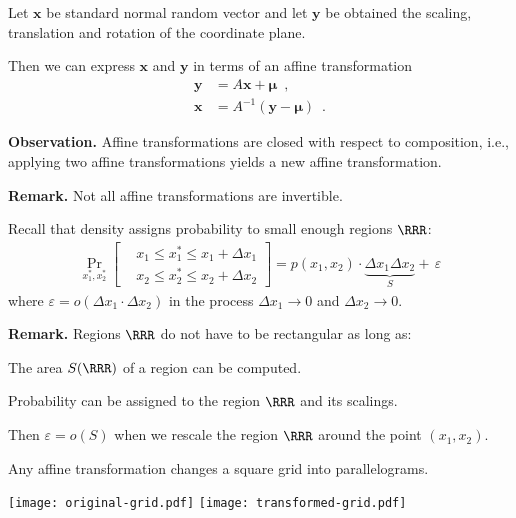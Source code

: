 \documentclass[landscape,footrule]{foils}
\renewcommand{\vec}[1]{\boldsymbol{#1}}
\newcommand{\lastline}{\vspace*{-2ex}}
\begin{document}
Let $\vec{x}$ be standard normal random vector and let $\vec{y}$ be obtained the scaling,  translation and rotation of the coordinate plane.

Then we can express $\vec{x}$ and $\vec{y}$ in terms of an affine transformation
\begin{align*}
  \vec{y}&=A\vec{x}+\vec{\mu} \enspace,\\
  \vec{x}&=A^{-1}(\vec{y}-\vec{\mu}) \enspace.
\end{align*}

\textbf{Observation.}
Affine transformations are closed with respect to composition, i.e., applying two affine transformations yields a new affine transformation. \vspace*{2ex}

\textbf{Remark.} Not all affine transformations are invertible.\lastline




Recall that density assigns probability to small enough regions $\RRR$:
\begin{align*}
\Pr_{x_1^*,x_2^*}
\left[\begin{aligned}
   &x_1\leq x_1^*\leq x_1+\Delta x_1\\ 
   &x_2\leq x_2^*\leq x_2+\Delta x_2
\end{aligned}\right]= p(x_1,x_2)\cdot\underbrace{\Delta x_1\Delta x_2}_S +\, \varepsilon
\end{align*}
where $\varepsilon=o(\Delta x_1\cdot\Delta x_2)$ in the process $\Delta x_1\to 0$ and $\Delta x_2\to 0$.\vspace*{1cm}

\textbf{Remark.} Regions $\RRR$ do not have to be rectangular as long as:
\begin{triangles}
\item The area $S(\RRR)$ of a region can be computed.  
\item Probability can be assigned to the region $\RRR$ and its scalings.
\end{triangles}
Then $\varepsilon=o(S)$ when we rescale the region $\RRR$ around the point $(x_1,x_2)$.



Any affine transformation changes a square grid into parallelograms. \vspace*{-1cm}
\begin{center}
\texttt{[image: original-grid.pdf]}
\raisebox{4.0cm}{$\quad\xrightarrow{\vec{y}=A\vec{x}+\vec{\mu}}\quad$}
\texttt{[image: transformed-grid.pdf]}
\end{center}\vspace*{-1cm}
\end{document}
